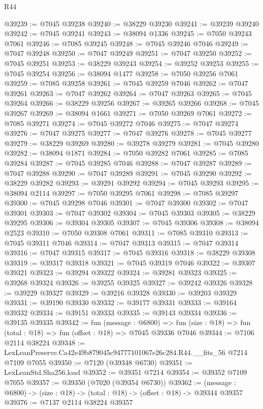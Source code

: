 \begin{lexlean}{R44}
\begin{coremodule}
{@39239 := @7045 @39238
@39240 := @38229 @39230
@39241 := @39239 @39240
@39242 := @7045 @39241
@39243 := @38094 @1336
@39245 := @7050 @39243 @7061
@39246 := @7085 @39245
@39248 := @7045 @39246 @7046
@39249 := @7047 @39248
@39250 := @7047 @39249
@39251 := @7047 @39250
@39252 := @7045 @39251
@39253 := @38229 @39243
@39254 := @39252 @39253
@39255 := @7045 @39254
@39256 := @38094 @1477
@39258 := @7050 @39256 @7061
@39259 := @7085 @39258
@39261 := @7045 @39259 @7046
@39262 := @7047 @39261
@39263 := @7047 @39262
@39264 := @7047 @39263
@39265 := @7045 @39264
@39266 := @38229 @39256
@39267 := @39265 @39266
@39268 := @7045 @39267
@39269 := @38094 @1661
@39271 := @7050 @39269 @7061
@39272 := @7085 @39271
@39274 := @7045 @39272 @7046
@39275 := @7047 @39274
@39276 := @7047 @39275
@39277 := @7047 @39276
@39278 := @7045 @39277
@39279 := @38229 @39269
@39280 := @39278 @39279
@39281 := @7045 @39280
@39282 := @38094 @1871
@39284 := @7050 @39282 @7061
@39285 := @7085 @39284
@39287 := @7045 @39285 @7046
@39288 := @7047 @39287
@39289 := @7047 @39288
@39290 := @7047 @39289
@39291 := @7045 @39290
@39292 := @38229 @39282
@39293 := @39291 @39292
@39294 := @7045 @39293
@39295 := @38094 @2114
@39297 := @7050 @39295 @7061
@39298 := @7085 @39297
@39300 := @7045 @39298 @7046
@39301 := @7047 @39300
@39302 := @7047 @39301
@39303 := @7047 @39302
@39304 := @7045 @39303
@39305 := @38229 @39295
@39306 := @39304 @39305
@39307 := @7045 @39306
@39308 := @38094 @2523
@39310 := @7050 @39308 @7061
@39311 := @7085 @39310
@39313 := @7045 @39311 @7046
@39314 := @7047 @39313
@39315 := @7047 @39314
@39316 := @7047 @39315
@39317 := @7045 @39316
@39318 := @38229 @39308
@39319 := @39317 @39318
@39321 := @7045 @39319 @7046
@39322 := @39307 @39321
@39323 := @39294 @39322
@39324 := @39281 @39323
@39325 := @39268 @39324
@39326 := @39255 @39325
@39327 := @39242 @39326
@39328 := @39229 @39327
@39329 := @39216 @39328
@39330 := @39203 @39329
@39331 := @39190 @39330
@39332 := @39177 @39331
@39333 := @39164 @39332
@39334 := @39151 @39333
@39335 := @39143 @39334
@39336 := @39135 @39335
@39342 := fun (message : @6800) =>
  fun (size : @18) => fun (total : @18) => fun (offset : @18) => @7045 @39336 @7046
@39344 := @7106 @2114 @38224
@39348 := LexLeanPreserve.Ca42e49b879045c94777101067e26c284.R44.__fits_56 @7214 @7109 @7055
@39350 := @7120 (@39348 @6730)
@39351 := LexLeanStd.Sha256.load
@39352 := @39351 @7214
@39354 := @39352 @7109 @7055
@39357 := @39350 (@7020 (@39354 @6730))
@39362 := (message : @6800) -> (size : @18) -> (total : @18) -> (offset : @18) -> @39344 @39357
@39376 := @7137
    @2114
    @38224
    @39357
}
\end{coremodule}
\end{lexlean}
